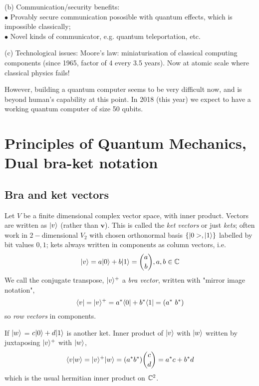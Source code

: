 \documentclass[a4paper]{article}
\begin{document}
(b) Communication/security benefits:\\
$\bullet$ Provably secure communication pososible with quantum effects, which is impossible classically;\\
$\bullet$ Novel kinds of communicator, e.g. quantum teleportation, etc.

(c) Technological issues: Moore's law: miniaturisation of classical computing components (since 1965, factor of 4 every 3.5 years). Now at atomic scale where classical physics fails!

However, building a quantum computer seems to be very difficult now, and is beyond human's capability at this point. In 2018 (this year) we expect to have a working quantum computer of size 50 qubits.

\newpage

\section{Principles of Quantum Mechanics, Dual bra-ket notation}

\subsection{Bra and ket vectors}

Let $V$ be a finite dimensional complex vector space, with inner product. Vectors are written as $|v\rangle$ (rather than $\mathbf{v}$). This is called the \emph{ket vectors} or just \emph{kets}; often work in $2-$dimensional $V_2$ with chosen orthonormal basis $\{|0>,|1\rangle\}$ labelled by bit values $0,1$; kets always written in components as column vectors, i.e.
\begin{equation*}
\begin{aligned}
|v\rangle = a|0\rangle+b|1\rangle = {a \choose b}, a,b \in \mathbb{C}
\end{aligned}
\end{equation*}
We call the conjugate transpose, $|v\rangle^+$ a \emph{bra vector}, written with "mirror image notation",$$\langle v| = |v\rangle^+ = a^*\langle 0| + b^* \langle 1| = (a^* \ b^*)$$ so \emph{row vectors} in components.

If $|w\rangle$ = $c|0\rangle + d|1\rangle$ is another ket. Inner product of $|v\rangle$ with $|w\rangle$ written by juxtaposing $|v\rangle^+$ with $|w\rangle$,
\begin{equation*}
\begin{aligned}
\langle v|w \rangle = |v\rangle^+ |w\rangle = (a^* b^*) {c \choose d} = a^*c + b^* d
\end{aligned}
\end{equation*}
which is the usual hermitian inner product on $\mathbb{C}^2$.
\end{document}
